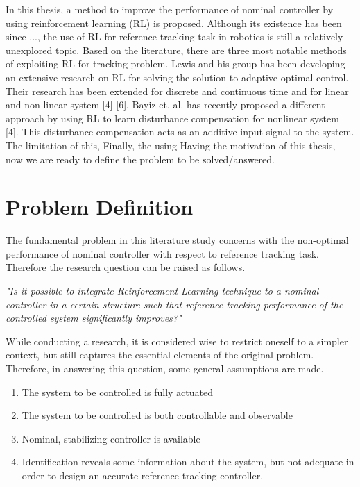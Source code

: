 In this thesis, a method to improve the performance of nominal controller by using reinforcement learning (RL) is proposed. Although its existence has been since ..., the use of RL for reference tracking task in robotics is still a relatively unexplored topic. Based on the literature, there are three most notable methods of exploiting RL for tracking problem. Lewis and his group has been developing an extensive research on RL for solving the solution to adaptive optimal control. Their research has been extended for discrete and continuous time and for linear and non-linear system [4]-[6]. Bayiz et. al. has recently proposed a different approach by using RL to learn disturbance compensation for nonlinear system [4]. This disturbance compensation acts as an additive input signal to the system. The limitation of this, Finally, the    using Having the motivation of this thesis, now we are ready to define the problem to be solved/answered.



\section{Problem Definition}
The fundamental problem in this literature study concerns with the non-optimal performance of nominal controller with respect to reference tracking task. Therefore the research question can be raised as follows.

\textit{"Is it possible to integrate Reinforcement Learning technique to a nominal controller in a certain structure such that reference tracking performance of the controlled system significantly improves?"}

While conducting a research, it is considered wise to restrict oneself to a simpler context, but still captures the essential elements of the original problem. Therefore, in answering this question, some general assumptions are made.

\begin{enumerate}
	\item The system to be controlled is fully actuated
	\item The system to be controlled is both controllable and observable
	\item Nominal, stabilizing controller is available	
	\item Identification reveals some information about the system, but not adequate in order to design an accurate reference tracking controller.
\end{enumerate}

